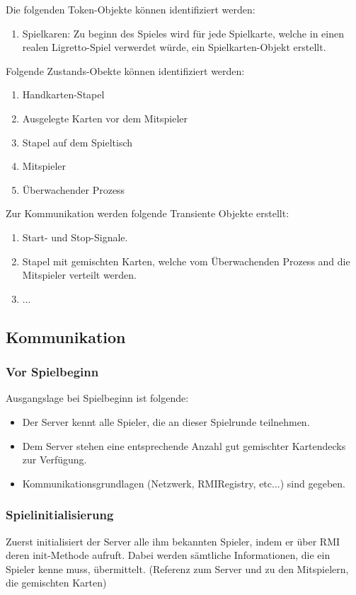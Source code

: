 Die folgenden Token-Objekte können identifiziert werden:
\begin{enumerate}
	\item Spielkaren: Zu beginn des Spieles wird für jede Spielkarte, welche in einen realen Ligretto-Spiel verwerdet würde, ein Spielkarten-Objekt erstellt.
\end{enumerate}

Folgende Zustands-Obekte können identifiziert werden:
\begin{enumerate}
	\item Handkarten-Stapel
	\item Ausgelegte Karten vor dem Mitspieler
	\item Stapel auf dem Spieltisch
	\item Mitspieler
	\item Überwachender Prozess
\end{enumerate}

Zur Kommunikation werden folgende Transiente Objekte erstellt:
\begin{enumerate}
	\item Start- und Stop-Signale.
	\item Stapel mit gemischten Karten, welche vom Überwachenden Prozess and die Mitspieler verteilt werden.
	\item ...
\end{enumerate}

\subsection{Kommunikation}


\subsubsection{Vor Spielbeginn}

Ausgangslage bei Spielbeginn ist folgende:
\begin{itemize}
\item Der Server kennt alle Spieler, die an dieser Spielrunde teilnehmen.
\item Dem Server stehen eine entsprechende Anzahl gut gemischter Kartendecks zur Verfügung.
\item Kommunikationsgrundlagen (Netzwerk, RMIRegistry, etc...) sind gegeben.
\end{itemize}

\subsubsection{Spielinitialisierung}
Zuerst initialisiert der Server alle ihm bekannten Spieler, indem er über RMI deren init-Methode aufruft. Dabei werden sämtliche Informationen, die ein Spieler kenne muss, übermittelt. (Referenz zum Server und zu den Mitspielern, die gemischten Karten)

